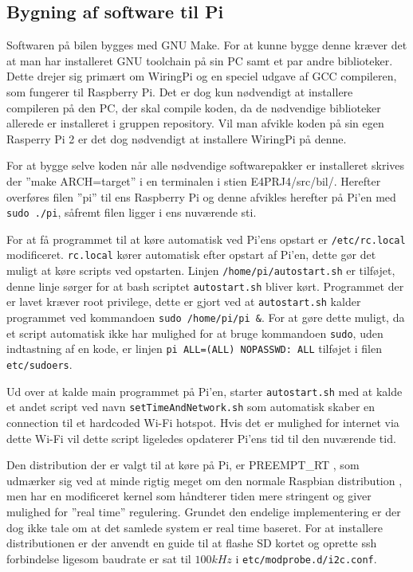 \subsection{Bygning af software til Pi}

Softwaren på bilen bygges med GNU Make\cite{lib:GNU_make}.
For at kunne bygge denne kræver det at man har installeret GNU toolchain på sin PC samt et par andre biblioteker.
Dette drejer sig primært om WiringPi\cite{lib:wiringpi} og en speciel udgave af GCC compileren, som fungerer til Raspberry Pi\cite{lib:pi_tools}.
Det er dog kun nødvendigt at installere compileren på den PC, der skal compile koden, da de nødvendige biblioteker allerede er installeret i gruppen repository. 
Vil man afvikle koden på sin egen Rasperry Pi 2 er det dog nødvendigt at installere WiringPi \cite{lib:wiringpi} på denne.

For at bygge selve koden når alle nødvendige softwarepakker er installeret skrives der ''make ARCH=target'' i en terminalen i stien E4PRJ4/src/bil/.
Herefter overføres filen ''pi'' til ens Raspberry Pi og denne afvikles herefter på Pi'en med \texttt{sudo ./pi}, såfremt filen ligger i ens nuværende sti.

For at få programmet til at køre automatisk ved Pi'ens opstart er \texttt{/etc/rc.local} modificeret. \texttt{rc.local} kører automatisk efter opstart af Pi'en, dette gør det muligt at køre scripts ved opstarten. Linjen \texttt{/home/pi/autostart.sh} er tilføjet, denne linje sørger for at bash scriptet \texttt{autostart.sh} bliver kørt. Programmet der er lavet kræver root privilege, dette er gjort ved at \texttt{autostart.sh} kalder programmet ved kommandoen \texttt{sudo /home/pi/pi \&}.
For at gøre dette muligt, da et script automatisk ikke har mulighed for at bruge kommandoen \texttt{sudo}, uden indtastning af en kode, er linjen \texttt{pi ALL=(ALL) NOPASSWD: ALL} tilføjet i filen \texttt{etc/sudoers}.

Ud over at kalde main programmet på Pi'en, starter \texttt{autostart.sh} med at kalde et andet script ved navn \texttt{setTimeAndNetwork.sh} som automatisk skaber en connection til et hardcoded Wi-Fi hotspot. Hvis det er mulighed for internet via dette Wi-Fi vil dette script ligeledes opdaterer Pi'ens tid til den nuværende tid.

Den distribution der er valgt til at køre på Pi, er PREEMPT\_RT \cite{lib:PREEMPT_RT}, som udmærker sig ved at minde rigtig meget om den normale Raspbian distribution \cite{lib:raspbian}, men har en modificeret kernel som håndterer tiden mere stringent og giver mulighed for ''real time'' regulering. Grundet den endelige implementering er der dog ikke tale om at det samlede system er real time baseret. For at installere distributionen er der anvendt en guide til at flashe SD kortet \cite{lib:rpi_sd} og oprette ssh forbindelse \cite{lib:ssh} ligesom \IIC baudrate er sat til $100kHz$ i \texttt{etc/modprobe.d/i2c.conf}.

